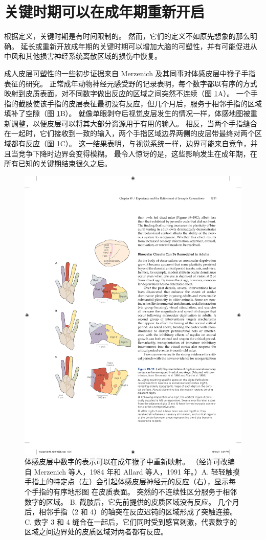 \section{关键时期可以在成年期重新开启}

根据定义，关键时期是有时间限制的。
然而，它们的定义不如原先想象的那么明确。
延长或重新开放成年期的关键时期可以增加大脑的可塑性，并有可能促进从中风和其他损害神经系统离散区域的损伤中恢复。


成人皮层可塑性的一些初步证据来自 Merzenich 及其同事对体感皮层中猴子手指表征的研究。
正常成年动物神经元感受野的记录表明，每个数字都以有序的方式映射到皮质表面，对不同数字做出反应的区域之间突然不连续（图 \ref{fig:49_19}A）。
一个手指的截肢使该手指的皮层表征最初没有反应，但几个月后，服务于相邻手指的区域填补了空隙（图 \ref{fig:49_19}B）。
就像单眼剥夺后视觉皮层发生的情况一样，体感地图被重新调整，以便皮层可以将其大部分资源用于有用的输入。 相反，当两个手指缝合在一起时，它们接收到一致的输入，两个手指区域边界两侧的皮层带最终对两个区域都有反应（图 \ref{fig:49_19}C）。
这一结果表明，与视觉系统一样，边界可能来自竞争，并且当竞争下降时边界会变得模糊。
最令人惊讶的是，这些影响发生在成年期，在所有已知的关键期结束很久之后。


\begin{figure}[htbp]
	\centering
	\includegraphics[width=0.5\linewidth]{chap49/fig_49_19}
	\caption{体感皮层中数字的表示可以在成年猴子中重新映射。 （经许可改编自 Merzenich 等人，1984 年和 Allard 等人，1991 年。）A. 轻轻触摸手指上的特定点（左）会引起体感皮层神经元的反应（右），显示每个手指的有序地形图 在皮质表面。 突然的不连续性区分服务于相邻数字的区域。 B. 截肢后，它先前提供的皮质区域没有反应。 几个月后，相邻手指（2 和 4）的轴突在反应迟钝的区域形成了突触连接。 C. 数字 3 和 4 缝合在一起后，它们同时受到感官刺激，代表数字的区域之间边界处的皮质区域对两者都有反应。}
	\label{fig:49_19}
\end{figure}


